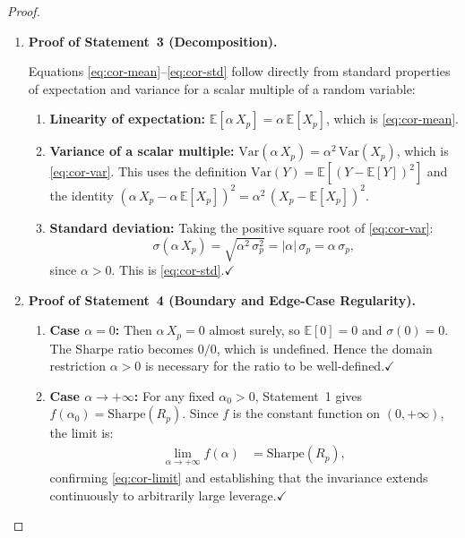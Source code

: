 \documentclass[12pt,openany]{book}
\newcommand{\E}{\mathbb{E}}
\numberwithin{equation}{chapter}
\theoremstyle{plain}
\theoremstyle{definition}
\theoremstyle{remark}
\numberwithin{equation}{chapter}
\theoremstyle{plain}
\begin{document}
\begin{proof}
\begin{enumerate}
  \item \textbf{Proof of Statement~3 (Decomposition).}

        \noindent
        Equations \eqref{eq:cor-mean}--\eqref{eq:cor-std}
        follow directly from standard properties of
        expectation and variance for a scalar multiple of
        a random variable:
        \begin{enumerate}
          \item \textbf{Linearity of expectation:}
                $\E[\alpha\,X_p] = \alpha\,\E[X_p]$,
                which is \eqref{eq:cor-mean}.
          \item \textbf{Variance of a scalar multiple:}
                $\mathrm{Var}(\alpha\,X_p)
                 = \alpha^{2}\,\mathrm{Var}(X_p)$,
                which is \eqref{eq:cor-var}.  This uses the
                definition $\mathrm{Var}(Y)
                = \E[(Y - \E[Y])^{2}]$ and the identity
                $(\alpha\,X_p - \alpha\,\E[X_p])^{2}
                = \alpha^{2}\,(X_p - \E[X_p])^{2}$.
          \item \textbf{Standard deviation:}
                Taking the positive square root of
                \eqref{eq:cor-var}:
                \[
                  \sigma(\alpha\,X_p)
                    = \sqrt{\alpha^{2}\,\sigma_p^{2}}
                    = |\alpha|\,\sigma_p
                    = \alpha\,\sigma_p,
                \]
                since $\alpha > 0$.  This is
                \eqref{eq:cor-std}.\hfill$\checkmark$
        \end{enumerate}

  \item \textbf{Proof of Statement~4 (Boundary and
        Edge-Case Regularity).}

        \begin{enumerate}
          \item \textbf{Case $\alpha = 0$:}
                Then $\alpha\,X_p = 0$ almost surely, so
                $\E[0] = 0$ and $\sigma(0) = 0$.  The Sharpe
                ratio becomes $0/0$, which is undefined.
                Hence the domain restriction $\alpha > 0$
                is necessary for the ratio to be
                well-defined.\hfill$\checkmark$

          \item \textbf{Case $\alpha \to +\infty$:}
                For any fixed $\alpha_0 > 0$,
                Statement~1 gives $f(\alpha_0)
                = \mathrm{Sharpe}(R_p)$.  Since
                $f$ is the constant function on
                $(0,+\infty)$, the limit is:
                \begin{align}
                  \lim_{\alpha \to +\infty} f(\alpha)
                    &= \mathrm{Sharpe}(R_p),
                  \label{eq:cor-lim2}
                \end{align}
                confirming \eqref{eq:cor-limit} and
                establishing that the invariance extends
                continuously to arbitrarily large
                leverage.\hfill$\checkmark$


\end{enumerate}
\end{enumerate}
\end{proof}
\end{document}
